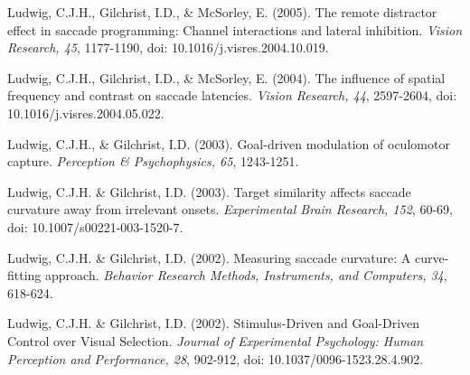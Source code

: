 \documentclass[a4paper, 10pt]{article}
\renewenvironment{itemize}{
  \begin{list}{}{
    \setlength{\leftmargin}{1.5em}
  }
}{
  \end{list}
}
\begin{document}
\begin{itemize}
\item Ludwig, C.J.H., Gilchrist, I.D., \& McSorley, E. (2005). The remote distractor effect in saccade programming: Channel interactions and lateral inhibition. {\it Vision Research, 45}, 1177-1190, doi: 10.1016/j.visres.2004.10.019.
\item Ludwig, C.J.H., Gilchrist, I.D., \& McSorley, E. (2004). The influence of spatial frequency and contrast on saccade latencies. {\it Vision Research, 44}, 2597-2604, doi: 10.1016/j.visres.2004.05.022.
\item Ludwig, C.J.H., \& Gilchrist, I.D. (2003). Goal-driven modulation of oculomotor capture. {\it Perception \& Psychophysics, 65}, 1243-1251.
\item Ludwig, C.J.H. \& Gilchrist, I.D. (2003). Target similarity affects saccade curvature away from irrelevant onsets. {\it Experimental Brain Research, 152}, 60-69, doi: 10.1007/s00221-003-1520-7.
\item Ludwig, C.J.H. \& Gilchrist, I.D. (2002). Measuring saccade curvature: A curve-fitting approach. {\it Behavior Research Methods, Instruments, and Computers, 34}, 618-624.
\item Ludwig, C.J.H. \& Gilchrist, I.D. (2002). Stimulus-Driven and Goal-Driven Control over Visual Selection. {\it Journal of Experimental Psychology: Human Perception and Performance, 28}, 902-912, doi: 10.1037/0096-1523.28.4.902.
\end{itemize}

\end{document}
